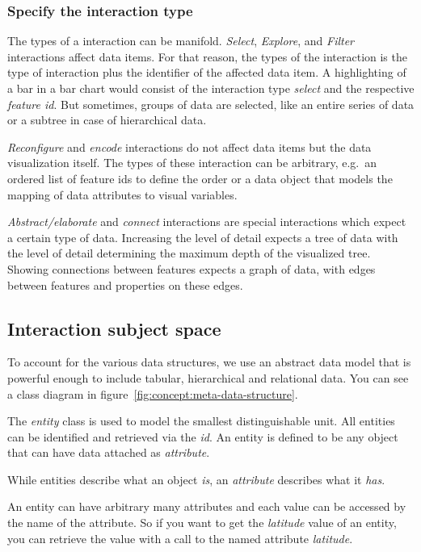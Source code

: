 \documentclass{article}
\begin{document}
\subsubsection{Specify the interaction type}

The types of a interaction can be manifold.
\emph{Select}, \emph{Explore}, and \emph{Filter} interactions affect data items.
For that reason, the types of the interaction is the type of interaction plus the identifier of the affected data item.
A highlighting of a bar in a bar chart would consist of the interaction type \emph{select} and the respective \emph{feature id}.
But sometimes, groups of data are selected, like an entire series of data or a subtree in case of hierarchical data.

\emph{\emph{Reconfigure}} and \emph{encode} interactions do not affect data items but the data visualization itself.
The types of these interaction can be arbitrary, e.g.\ an ordered list of feature ids to define the order or a data object that models the mapping of data attributes to visual variables.

\emph{Abstract/elaborate} and \emph{connect} interactions are special interactions which expect a certain type of data.
Increasing the level of detail expects a tree of data with the level of detail determining the maximum depth of the visualized tree.
Showing connections between features expects a graph of data, with edges between features and properties on these edges.


\subsection{Interaction subject space}\label{sec:concept:space}
To account for the various data structures, we use an abstract data model that is powerful enough to include tabular, hierarchical and relational data.
You can see a class diagram in figure~\ref{fig:concept:meta-data-structure}.

The \emph{entity} class is used to model the smallest distinguishable unit.
All entities can be identified and retrieved via the \emph{id}.
An entity is defined to be any object that can have data attached as \emph{attribute}.

While entities describe what an object \emph{is}, an \emph{attribute} describes what it \emph{has}.

An entity can have arbitrary many attributes and each value can be accessed by the name of the attribute.
So if you want to get the \emph{latitude} value of an entity, you can retrieve the value with a call to the named attribute \emph{latitude}.
\end{document}
